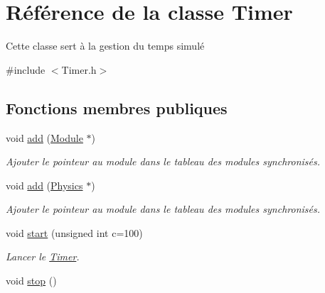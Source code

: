 \hypertarget{classTimer}{\section{Référence de la classe Timer}
\label{classTimer}
}


Cette classe sert à la gestion du temps simulé  




{\ttfamily \#include $<$Timer.\-h$>$}

\subsection*{Fonctions membres publiques}
\begin{DoxyCompactItemize}
\item 
\hypertarget{classTimer_aeae0c417d77a86462b51da0615eab8b4}{void \hyperlink{classTimer_aeae0c417d77a86462b51da0615eab8b4}{add} (\hyperlink{classModule}{Module} $\ast$)}\label{classTimer_aeae0c417d77a86462b51da0615eab8b4}

\begin{DoxyCompactList}\small\item\em Ajouter le pointeur au module dans le tableau des modules synchronisés. \end{DoxyCompactList}\item 
\hypertarget{classTimer_a6cc5f746e08a0ec915123ef9687cb691}{void \hyperlink{classTimer_a6cc5f746e08a0ec915123ef9687cb691}{add} (\hyperlink{classPhysics}{Physics} $\ast$)}\label{classTimer_a6cc5f746e08a0ec915123ef9687cb691}

\begin{DoxyCompactList}\small\item\em Ajouter le pointeur au module dans le tableau des modules synchronisés. \end{DoxyCompactList}\item 
\hypertarget{classTimer_a62869fa83e1b76a9ebfe9cca7e56733d}{void \hyperlink{classTimer_a62869fa83e1b76a9ebfe9cca7e56733d}{start} (unsigned int c=100)}\label{classTimer_a62869fa83e1b76a9ebfe9cca7e56733d}

\begin{DoxyCompactList}\small\item\em Lancer le \hyperlink{classTimer}{Timer}. \end{DoxyCompactList}\item 
\hypertarget{classTimer_a63f0eb44b27402196590a03781515dba}{void \hyperlink{classTimer_a63f0eb44b27402196590a03781515dba}{stop} ()}\label{classTimer_a63f0eb44b27402196590a03781515dba}


\end{DoxyCompactItemize}
